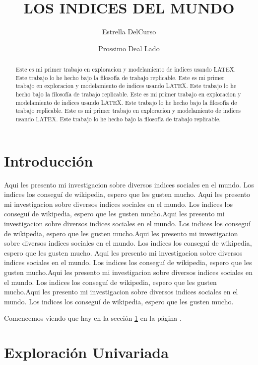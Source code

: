 \documentclass{article}
\title{LOS INDICES DEL MUNDO}
\author[1]{\normalsize Estrella DelCurso}
\author[2]{\normalsize Prossimo Deal Lado}
\affil[1,2]{\small  Escuela de Ingeniería,Universidad de la vida\\
\texttt{{delcurso,deallado}@vida.edu}}
\affil[1]{\small Instituto de altas investigaciones financieras\\
Banco del Parque\\
\texttt{delcurso@bp.com}}
\date{}
\begin{document}


\maketitle


\begin{abstract}
Este es mi primer trabajo en exploracion y modelamiento de indices usando LATEX. Este trabajo lo he hecho bajo la filosofía de trabajo replicable. Este es mi primer trabajo en exploracion y modelamiento de indices usando LATEX. Este trabajo lo he hecho bajo la filosofía de trabajo replicable. Este es mi primer trabajo en exploracion y modelamiento de indices usando LATEX. Este trabajo lo he hecho bajo la filosofía de trabajo replicable. Este es mi primer trabajo en exploracion y modelamiento de indices usando LATEX. Este trabajo lo he hecho bajo la filosofía de trabajo replicable.
\end{abstract}

\section*{Introducción}

Aqui les presento mi investigacion sobre diversos indices sociales en el mundo. Los indices los conseguí de wikipedia, espero que les gusten mucho. Aqui les presento mi investigacion sobre diversos indices sociales en el mundo. Los indices los conseguí de wikipedia, espero que les gusten mucho.Aqui les presento mi investigacion sobre diversos indices sociales en el mundo. Los indices los conseguí de wikipedia, espero que les gusten mucho.Aqui les presento mi investigacion sobre diversos indices sociales en el mundo. Los indices los conseguí de wikipedia, espero que les gusten mucho.
Aqui les presento mi investigacion sobre diversos indices sociales en el mundo. Los indices los conseguí de wikipedia, espero que les gusten mucho.Aqui les presento mi investigacion sobre diversos indices sociales en el mundo. Los indices los conseguí de wikipedia, espero que les gusten mucho.Aqui les presento mi investigacion sobre diversos indices sociales en el mundo. Los indices los conseguí de wikipedia, espero que les gusten mucho.

Comencemos viendo que hay en la sección \ref{univariada} en la página \pageref{univariada}.

\clearpage



\section{Exploración Univariada}\label{univariada}
\end{document}
